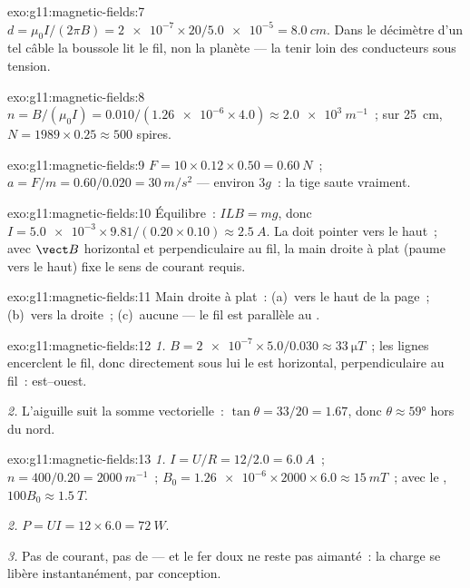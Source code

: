 \begin{solution}{exo:g11:magnetic-fields:7}
$d = \mu_0 I / (2\pi B) = \num{2e-7} \times 20 / \num{5.0e-5}
= \qty{8.0}{cm}$. Dans le décimètre d'un tel câble la boussole lit le
fil, non la planète --- la tenir loin des conducteurs sous tension.
\end{solution}

\begin{solution}{exo:g11:magnetic-fields:8}
$n = B/(\mu_0 I) = 0.010 / (\num{1.26e-6} \times 4.0)
\approx \qty{2.0e3}{m^{-1}}$~; sur \qty{25}{cm},
$N = 1989 \times 0.25 \approx 500$ spires.
\end{solution}

\begin{solution}{exo:g11:magnetic-fields:9}
$F = 10 \times 0.12 \times 0.50 = \qty{0.60}{N}$~;
$a = F/m = 0.60/0.020 = \qty{30}{m/s^2}$ --- environ $3g$~: la tige
saute vraiment.
\end{solution}

\begin{solution}{exo:g11:magnetic-fields:10}
Équilibre~: $ILB = mg$, donc
$I = \num{5.0e-3} \times 9.81 / (0.20 \times 0.10) \approx
\qty{2.5}{A}$. La  doit pointer vers le
haut~; avec $\vect B$ horizontal et perpendiculaire au fil, la main
droite à plat (paume vers le haut) fixe le sens de courant requis.
\end{solution}

\begin{solution}{exo:g11:magnetic-fields:11}
Main droite à plat~: (a)~vers le haut de la page~; (b)~vers la
droite~; (c)~aucune  --- le fil est
parallèle au .
\end{solution}

\begin{solution}{exo:g11:magnetic-fields:12}
\emph{1.} $B = \num{2e-7} \times 5.0 / 0.030 \approx
\qty{33}{\micro T}$~; les lignes encerclent le fil, donc directement
sous lui le  est horizontal,
perpendiculaire au fil~: est--ouest.

\emph{2.} L'aiguille suit la somme vectorielle~: $\tan\theta = 33/20 =
1.67$, donc $\theta \approx \ang{59}$ hors du nord.
\end{solution}

\begin{solution}{exo:g11:magnetic-fields:13}
\emph{1.} $I = U/R = 12/2.0 = \qty{6.0}{A}$~;
$n = 400/0.20 = \qty{2000}{m^{-1}}$~;
$B_0 = \num{1.26e-6} \times 2000 \times 6.0 \approx \qty{15}{mT}$~;
avec le , $100 B_0 \approx \qty{1.5}{T}$.

\emph{2.} $P = UI = 12 \times 6.0 = \qty{72}{W}$.

\emph{3.} Pas de courant, pas de
 --- et le fer doux ne reste
pas aimanté~: la charge se libère instantanément, par conception.
\end{solution}

